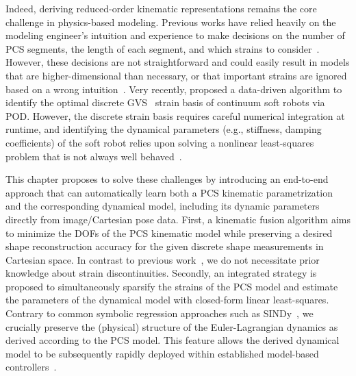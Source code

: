 %
Indeed, deriving reduced-order kinematic representations remains the core challenge in physics-based modeling. 
%
Previous works have relied heavily on the modeling engineer's intuition and experience to make decisions on the number of \gls{PCS} segments, the length of each segment, and which strains to consider~\citep{toshimitsu2021sopra}. However, these decisions are not straightforward and could easily result in models that are higher-dimensional than necessary, or that important strains are ignored based on a wrong intuition~\citep{garg2022kinematic}.
Very recently, \citet{alkayas2025soft} proposed a data-driven algorithm to identify the optimal discrete \gls{GVS}~\cite{boyer2020dynamics} strain basis of continuum soft robots via \gls{POD}. 
However, the discrete strain basis requires careful numerical integration at runtime, and identifying the dynamical parameters (e.g., stiffness, damping coefficients) of the soft robot relies upon solving a nonlinear least-squares problem that is not always well behaved~\citep{stolzle2024experimental}.

This chapter proposes to solve these challenges by introducing an end-to-end approach that can automatically learn both a \gls{PCS} kinematic parametrization and the corresponding dynamical model, including its dynamic parameters directly from image/Cartesian pose data.
First, a kinematic fusion algorithm aims to minimize the \glspl{DOF} of the \gls{PCS} kinematic model while preserving a desired shape reconstruction accuracy for the given discrete shape measurements in Cartesian space. In contrast to previous work~\citep{alkayas2025soft}, we do not necessitate prior knowledge about strain discontinuities.
Secondly, an integrated strategy is proposed to simultaneously sparsify the strains of the \gls{PCS} model and estimate the parameters of the dynamical model with closed-form linear least-squares.
Contrary to common symbolic regression approaches such as \gls{SINDy}~\citep{kaiser2018sparse}, we crucially preserve the (physical) structure of the Euler-Lagrangian dynamics as derived according to the \gls{PCS} model.
This feature allows the derived dynamical model to be subsequently rapidly deployed within established model-based controllers~\citep{della2023model}.

